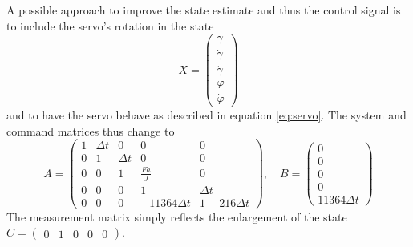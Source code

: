 \documentclass[a4paper]{article}
\begin{document}
A possible approach to improve the state estimate and thus the control signal is to include the servo's rotation in the state \begin{equation}X=\begin{pmatrix}\gamma \\ \dot{\gamma} \\ \ddot{\gamma} \\ \varphi \\ \dot{\varphi}\end{pmatrix}\end{equation} and to have the servo behave as described in equation \ref{eq:servo}. The system and command matrices thus change to \begin{equation}A=\begin{pmatrix}1 & \Delta t & 0 & 0 & 0 \\
0 & 1 & \Delta t & 0 & 0 \\
0 & 0 & 1 & \frac{Fa}{J} & 0 \\
0 & 0 & 0 & 1 & \Delta t \\
0 & 0 & 0 & -11364 \Delta t & 1-216 \Delta t\end{pmatrix}, \quad B = \begin{pmatrix}0 \\ 0 \\ 0 \\ 0 \\ 11364 \Delta t\end{pmatrix}\end{equation} The measurement matrix simply reflects the enlargement of the state $C=\begin{pmatrix}0 & 1 & 0 & 0 & 0\end{pmatrix}$.
\end{document}
